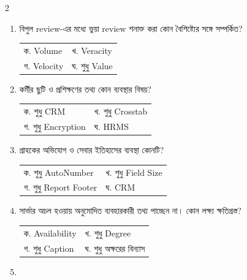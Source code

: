 \begin{multicols}{2}
\begin{enumerate}[resume]
\item \begin{minipage}[t]{\linewidth}
বিপুল review-এর মধ্যে ভুয়া review শনাক্ত করা কোন বৈশিষ্ট্যের সঙ্গে সম্পর্কিত?
\par\begin{tabularx}{\linewidth}{@{}X X@{}}
ক. Volume & খ. Veracity \\
গ. Velocity & ঘ. শুধু Value \\
\end{tabularx}
\end{minipage}
\vspace{1pt}
\item \begin{minipage}[t]{\linewidth}
কর্মীর ছুটি ও প্রশিক্ষণের তথ্য কোন ব্যবস্থার বিষয়?
\par
\begin{tabularx}{\linewidth}{@{}X X@{}}
ক. শুধু CRM & খ. শুধু Crosstab \\
গ. শুধু Encryption & ঘ. HRMS \\
\end{tabularx}
\end{minipage}
\vspace{1pt}
\item \begin{minipage}[t]{\linewidth}
গ্রাহকের অভিযোগ ও সেবার ইতিহাসের ব্যবস্থা কোনটি?
\par
\begin{tabularx}{\linewidth}{@{}X X@{}}
ক. শুধু AutoNumber & খ. শুধু Field Size \\
গ. শুধু Report Footer & ঘ. CRM \\
\end{tabularx}
\end{minipage}
\vspace{1pt}
\item \begin{minipage}[t]{\linewidth}
সার্ভার অচল হওয়ায় অনুমোদিত ব্যবহারকারী তথ্য পাচ্ছেন না। কোন লক্ষ্য ক্ষতিগ্রস্ত?
\par
\begin{tabularx}{\linewidth}{@{}X X@{}}
ক. Availability & খ. শুধু Degree \\
গ. শুধু Caption & ঘ. শুধু অক্ষরের বিন্যাস \\
\end{tabularx}
\end{minipage}
\vspace{1pt}
\item \begin{minipage}[t]{\linewidth}

\end{minipage}
\end{enumerate}
\end{multicols}
